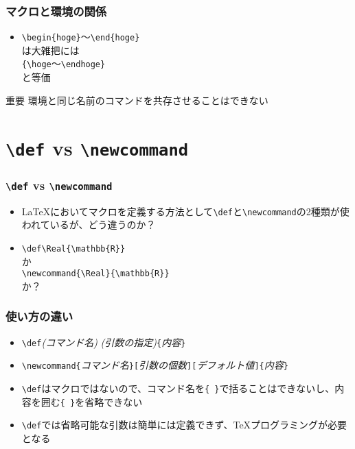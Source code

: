 \documentclass[aspectratio=169]{beamer}
\newcommand\cmdname[1]{\texttt{\textbackslash #1}}
\begin{document}
\begin{frame}[fragile]\frametitle{マクロと環境の関係}
  \begin{itemize}
  \item \lstinline!\begin{hoge}!〜\lstinline!\end{hoge}!\\
    は大雑把には\\
    \lstinline!{\hoge!〜\lstinline!\endhoge}!\\
    と等価
  \end{itemize}
  \begin{block}{重要}
    環境と同じ名前のコマンドを共存させることはできない
  \end{block}
\end{frame}
\section{\cmdname{def} vs \cmdname{newcommand}}
\begin{frame}[fragile]\frametitle{\cmdname{def} vs \cmdname{newcommand}}
  \begin{itemize}
    \item \LaTeX においてマクロを定義する方法として\cmdname{def}と\cmdname{newcommand}の2種類が使われているが、どう違うのか？
    \item \lstinline!\def\Real{\mathbb{R}}!\\
      か\\
      \lstinline!\newcommand{\Real}{\mathbb{R}}!\\
      か？
  \end{itemize}
\end{frame}
\begin{frame}[fragile]\frametitle{使い方の違い}
  \begin{itemize}
  \item \cmdname{def}\emph{(コマンド名)} \emph{(引数の指定)}\texttt{\{}\emph{内容}\texttt{\}}
  \item \cmdname{newcommand}\texttt{\{}\emph{コマンド名}\texttt{\}[}\emph{引数の個数}\texttt{][}\emph{デフォルト値}\texttt{]\{}\emph{内容}\texttt{\}}
  \item \cmdname{def}はマクロではないので、コマンド名を\texttt{\{~\}}で括ることはできないし、内容を囲む\texttt{\{~\}}を省略できない
  \item \cmdname{def}では省略可能な引数は簡単には定義できず、\TeX プログラミングが必要となる
  \end{itemize}
\end{frame}
\end{document}

